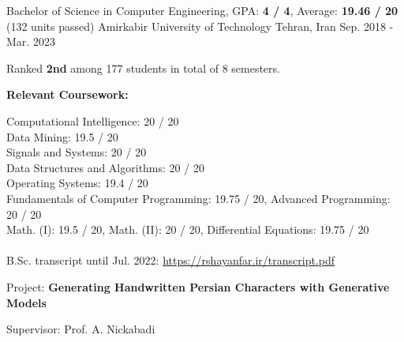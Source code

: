

\begin{cventries}

  \cventry
    {Bachelor of Science in Computer Engineering, GPA: \textbf{4 / 4}, Average: \textbf{19.46 / 20} (132 units passed)} %
    {Amirkabir University of Technology} %
    {Tehran, Iran} %
    {Sep. 2018 - Mar. 2023} %
    {
      \begin{cvitems}
        \item{Ranked \textbf{2nd} among 177 students in total of 8 semesters.}
        \item{
          \textbf{Relevant Coursework:}
          \smallskip
          \begin{adjustwidth}{4mm}{}
            Computational Intelligence: 20 / 20 \\
	          Data Mining: 19.5 / 20 \\
          	Signals and Systems: 20 / 20 \\
          	Data Structures and Algorithms: 20 / 20 \\
          	Operating Systems: 19.4 / 20 \\
          	Fundamentals of Computer Programming: 19.75 / 20, Advanced Programming: 20 / 20 \\
          	Math. (I): 19.5 / 20, Math. (II): 20 / 20, Differential Equations: 19.75 / 20 \\
            \\[-2mm]
          	\textcolor{awesome-skyblue}{B.Sc. transcript until Jul. 2022: \href{https://rshayanfar.ir/transcript.pdf}{https://rshayanfar.ir/transcript.pdf}}
          	\medskip
          \end{adjustwidth}
        }
        \item{
          Project: \textbf{Generating Handwritten Persian Characters with Generative Models}
        }
        \item{
          Supervisor: Prof. A. Nickabadi
        }
      \end{cvitems}
    }


\end{cventries}
